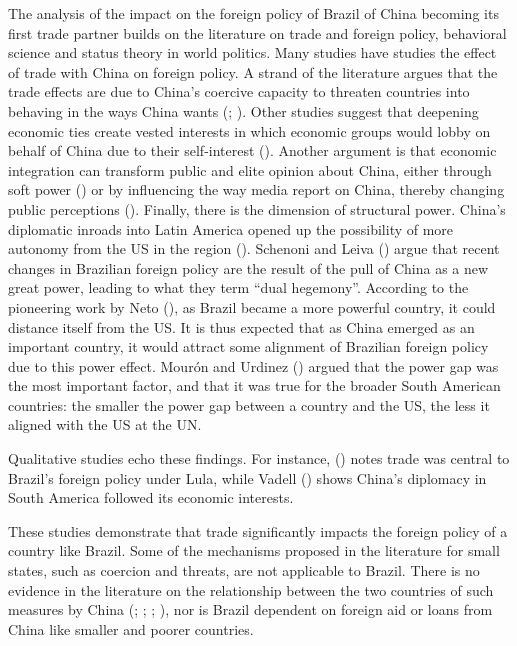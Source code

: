 \documentclass[
  12pt,
]{article}
\begin{document}
The analysis of the impact on the foreign policy of Brazil of China
becoming its first trade partner builds on the literature on trade and
foreign policy, behavioral science and status theory in world politics.
Many studies have studies the effect of trade with China on foreign
policy. A strand of the literature argues that the trade effects are due
to China's coercive capacity to threaten countries into behaving in the
ways China wants (;
). Other studies suggest that
deepening economic ties create vested interests in which economic groups
would lobby on behalf of China due to their self-interest
(). Another
argument is that economic integration can transform public and elite
opinion about China, either through soft power
() or by influencing the way
media report on China, thereby changing public perceptions
(). Finally,
there is the dimension of structural power. China's diplomatic inroads
into Latin America opened up the possibility of more autonomy from the
US in the region (). Schenoni
and Leiva () argue that recent
changes in Brazilian foreign policy are the result of the pull of China
as a new great power, leading to what they term ``dual hegemony''.
According to the pioneering work by Neto
(), as Brazil became a more powerful
country, it could distance itself from the US. It is thus expected that
as China emerged as an important country, it would attract some
alignment of Brazilian foreign policy due to this power effect. Mourón
and Urdinez () argued that the
power gap was the most important factor, and that it was true for the
broader South American countries: the smaller the power gap between a
country and the US, the less it aligned with the US at the UN.

Qualitative studies echo these findings. For instance,
() notes trade was
central to Brazil's foreign policy under Lula, while Vadell
() shows China's diplomacy in South
America followed its economic interests.

These studies demonstrate that trade significantly impacts the foreign
policy of a country like Brazil. Some of the mechanisms proposed in the
literature for small states, such as coercion and threats, are not
applicable to Brazil. There is no evidence in the literature on the
relationship between the two countries of such measures by China
(;
;
;
), nor is
Brazil dependent on foreign aid or loans from China like smaller and
poorer countries.
\end{document}
